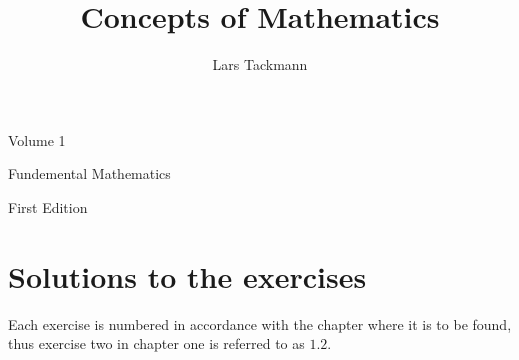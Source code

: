 \documentclass[11pt,twoside,openright]{memoir}
\author{Lars Tackmann}
\title{Concepts of Mathematics}
\makeatletter
\theoremstyle{definition}
\theoremstyle{remark}
\def\maketitle{%
  \null
  \thispagestyle{empty}%
  \vfill
  \begin{center}\leavevmode
    \normalfont
    {\LARGE\raggedleft \@author\par}%
    \hrulefill\par
    {\huge\raggedright \@title\par}%
    \vskip 1cm
    {\Large\raggedright Volume 1\par}%
    \vskip 0.5cm
    {\Large\raggedright Fundemental Mathematics \par}%
    \vskip 0.5cm
    {\Large\raggedright First Edition \par}%
  \end{center}%
  \vfill
  \null
  \cleardoublepage
  }
\makeatother
\begin{document}
\let\cleardoublepage\clearpage
\maketitle

\tableofcontents
{}



\mainmatter














%
%
%
%
%
%
%
%

%
%

%
%

\appendix
\chapter{Solutions to the exercises}
Each exercise is numbered in accordance with the chapter where it is to be found, thus exercise two in chapter one is referred to as $1.2$.
\shipoutAnswer

\backmatter
\printindex
\end{document}
